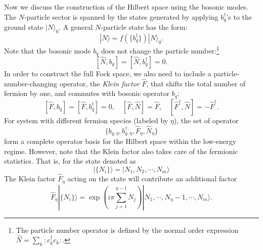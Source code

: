 \documentclass[aps,prb,superscriptaddress,nofootinbib]{revtex4}
\begin{document}
Now we discuss the construction of the Hilbert space using the bosonic modes.
The $N$-particle sector is spanned by the states generated by applying $b_q^\dagger$'s to the ground state $|N\rangle_0$.
A general $N$-particle state has the form:
\begin{equation}
	|N\rangle = f(\{b_q^\dagger\})|N\rangle_0.
\end{equation}
Note that the bosonic mode $b_q$ does not change the particle number:\footnote{The particle number operator is defined by the normal order expression $\hat{N} = \sum_k {:\mathrel{c_{k}^\dagger c_{k}}:}$.}
\begin{equation}
	\left[\hat N, b_q \right] = \left[\hat N, b_q^\dagger \right] = 0.
\end{equation}
In order to construct the full Fock space, we also need to include a particle-number-changing operator, the \textit{Klein factor} $\hat F$, that shifts the total number of fermion by one, and commutes with bosonic operator $b_q$:
\begin{equation}
	\left[\hat F, b_q \right] = \left[\hat F, b_q^\dagger \right] = 0, \quad
	\left[\hat F, \hat N \right] = \hat F, \quad 
	\left[\hat F^\dagger, \hat N \right] = -\hat F^\dagger.
\end{equation}
For system with different fermion species (labeled by $\eta$), the set of operator
\begin{equation*}
	\{b_{q,\eta}, b_{q,\eta}^\dagger, \hat F_\eta, \hat N_\eta\}
\end{equation*}
form a complete operator basis for the Hilbert space within the low-energy regime.
However, note that the Klein factor also takes care of the fermionic statistics. 
That is, for the state denoted as
\begin{equation}
	|\{N_i\}\rangle = |N_1,N_2,\cdots,N_m\rangle
\end{equation}
The Klein factor $\hat F_\eta$ acting on the state will contribute an additional factor
\begin{equation}
	\hat F_\eta|\{N_i\}\rangle = \exp\left(i\pi\sum_{j=1}^{\eta-1}N_j\right)|N_1,\cdots,N_\eta-1,\cdots,N_m\rangle.
\end{equation}
\end{document}
